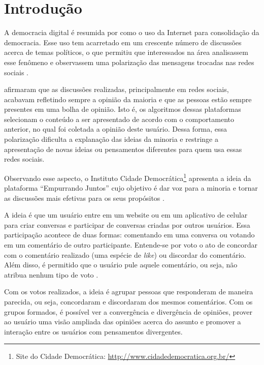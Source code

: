 \chapter[Introdução]{Introdução} \label{cap:introducao}

A democracia digital é resumida por  como o uso da Internet para consolidação da democracia.
Esse uso tem acarretado em um crescente número de discussões acerca de temas políticos, o que permitiu que interessados na área analisassem 
esse fenômeno e observassem uma polarização das mensagens trocadas nas redes sociais \cite{empurrandojuntos}.

 afirmaram que as discussões realizadas, principalmente em redes sociais, 
acabavam refletindo sempre a opinião da maioria e que as pessoas estão sempre presentes em uma bolha de opinião. 
Isto é, os algoritmos dessas plataformas selecionam o conteúdo a ser apresentado de acordo com o comportamento anterior,
no qual foi coletada a opinião deste usuário.
Dessa forma, essa polarização dificulta a explanação das ideias da minoria e restringe a apresentação de novas ideias ou pensamentos diferentes 
para quem usa essas redes sociais. 

Observando esse aspecto, o Instituto Cidade Democrática\footnote{Site do Cidade Democrática: \url{http://www.cidadedemocratica.org.br/}} 
apresenta a ideia da plataforma ``Empurrando Juntos'' cujo objetivo 
é dar voz para a minoria e tornar as discussões mais efetivas para os seus propósitos \cite{empurrandojuntos}.

A ideia é que um usuário entre em um website ou em um aplicativo de celular para criar conversas e 
participar de conversas criadas por outros usuários. Essa participação 
acontece de duas formas: comentando em uma conversa ou votando em um comentário de outro participante. Entende-se por voto
o ato de concordar com o comentário realizado (uma espécie de \textit{like}) ou discordar do comentário. Além disso, é permitido
que o usuário pule aquele comentário, ou seja, não atribua nenhum tipo de voto \cite{empurrandojuntos}. 

Com os votos realizados, a ideia é agrupar pessoas que responderam de maneira parecida, ou seja, concordaram e
discordaram dos mesmos comentários. Com os grupos formados, é possível ver a convergência e divergência de opiniões, 
prover ao usuário uma visão ampliada das opiniões acerca do assunto e promover a interação entre os usuários com 
pensamentos divergentes.


